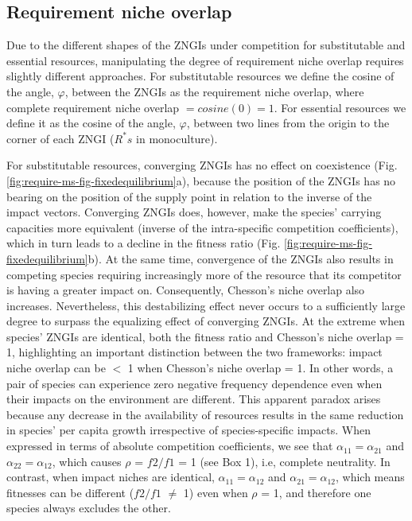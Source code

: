 \subsection{Requirement niche overlap}
Due to the different shapes of the ZNGIs under competition for substitutable and essential resources, manipulating the degree of requirement niche overlap requires slightly different approaches. For substitutable resources we define the cosine of the angle, $\varphi$, between the ZNGIs as the requirement niche overlap, where complete requirement niche overlap $= cosine(0) = 1$. For essential resources we define it as the cosine of the angle, $\varphi$, between two lines from the origin to the corner of each ZNGI ($R^{*}s$ in monoculture).
\par


For substitutable resources, converging ZNGIs has no effect on coexistence (Fig. \ref{fig:require-ms-fig-fixedequilibrium}a), because the position of the ZNGIs has no bearing on the position of the supply point in relation to the inverse of the impact vectors. Converging ZNGIs does, however, make the species' carrying capacities more equivalent (inverse of the intra-specific competition coefficients), which in turn leads to a decline in the fitness ratio (Fig. \ref{fig:require-ms-fig-fixedequilibrium}b). At the same time, convergence of the ZNGIs also results in competing species requiring increasingly more of the resource that its competitor is having a greater impact on. Consequently, Chesson's niche overlap also increases. Nevertheless, this destabilizing effect never occurs to a sufficiently large degree to surpass the equalizing effect of converging ZNGIs. At the extreme when species' ZNGIs are identical, both the fitness ratio and Chesson's niche overlap = 1, highlighting an important distinction between the two frameworks: impact niche overlap can be $<$ 1 when Chesson's niche overlap = 1. In other words, a pair of species can experience zero negative frequency dependence even when their impacts on the environment are different. This apparent paradox arises because any decrease in the availability of resources results in the same reduction in species’ per capita growth irrespective of species-specific impacts. When expressed in terms of absolute competition coefficients, we see that $\alpha_{11} = \alpha_{21}$ and $\alpha_{22} = \alpha_{12}$, which causes $\rho$ = $f2/f1$ = 1 (see Box 1), i.e, complete neutrality. In contrast, when impact niches are identical, $\alpha_{11} = \alpha_{12}$ and $\alpha_{21} = \alpha_{12}$, which means fitnesses can be different ($f2/f1$ $\neq$ 1) even when $\rho$ = 1, and therefore one species always excludes the other.  
\par


